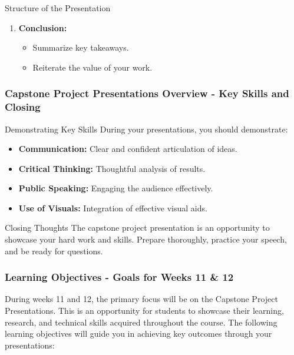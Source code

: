 \documentclass[aspectratio=169]{beamer}
\begin{document}
\begin{frame}[fragile]
\begin{block}{Structure of the Presentation}
\begin{enumerate}
            \item \textbf{Conclusion:}
            \begin{itemize}
                \item Summarize key takeaways.
                \item Reiterate the value of your work.
            \end{itemize}
        \end{enumerate}
    \end{block}
\end{frame}

\begin{frame}[fragile]
    \frametitle{Capstone Project Presentations Overview - Key Skills and Closing}
    \begin{block}{Demonstrating Key Skills}
        During your presentations, you should demonstrate:
        \begin{itemize}
            \item \textbf{Communication:} Clear and confident articulation of ideas.
            \item \textbf{Critical Thinking:} Thoughtful analysis of results.
            \item \textbf{Public Speaking:} Engaging the audience effectively.
            \item \textbf{Use of Visuals:} Integration of effective visual aids.
        \end{itemize}
    \end{block}

    \begin{block}{Closing Thoughts}
        The capstone project presentation is an opportunity to showcase your hard work and skills. 
        Prepare thoroughly, practice your speech, and be ready for questions.
    \end{block}
\end{frame}

\begin{frame}[fragile]
    \frametitle{Learning Objectives - Goals for Weeks 11 \& 12}
    During weeks 11 and 12, the primary focus will be on the Capstone Project Presentations. This is an opportunity for students to showcase their learning, research, and technical skills acquired throughout the course. The following learning objectives will guide you in achieving key outcomes through your presentations:
\end{frame}
\end{document}
